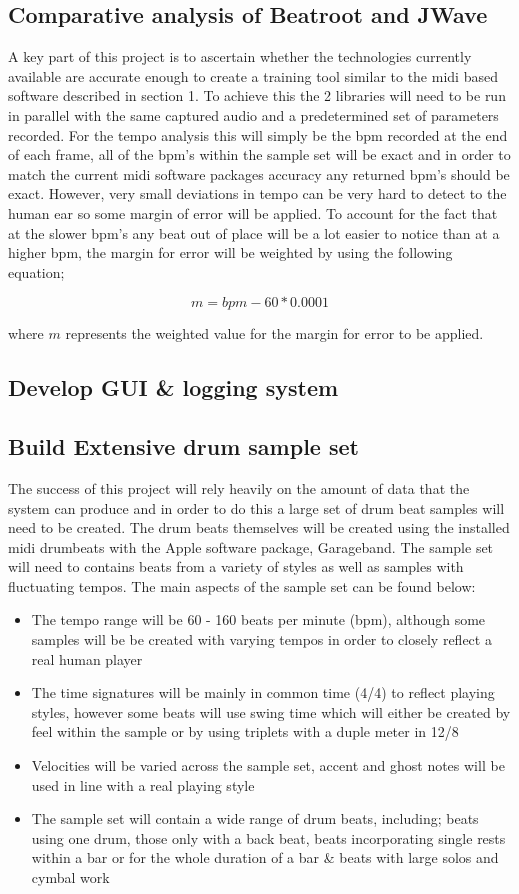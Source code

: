 \documentclass[a4paper, 11pt]{article}
\begin{document}
\subsection{Comparative analysis of Beatroot and JWave}
A key part of this project is to ascertain whether the technologies currently available are accurate enough to create a training tool similar to the midi based software described in section 1. To achieve this the 2 libraries will need to be run in parallel with the same captured audio and a predetermined set of parameters recorded. For the tempo analysis this will simply be the bpm recorded at the end of each frame, all of the bpm's within the sample set will be exact and in order to match the current midi software packages accuracy any returned bpm's should be exact. However, very small deviations in tempo can be very hard to detect to the human ear so some margin of error will be applied. To account for the fact that at the slower bpm's any beat out of place will be a lot easier to notice than at a higher bpm, the margin for error will be weighted by using the following equation;

\[ m = bpm - 60 * 0.0001\]

where \(m\) represents the weighted value for the margin for error to be applied.

\subsection{Develop GUI \& logging system}


\subsection{Build Extensive drum sample set}
The success of this project will rely heavily on the amount of data that the system can produce and in order to do this a large set of drum beat samples will need to be created. The drum beats themselves will be created using the installed midi drumbeats with the Apple software package, Garageband. The sample set will need to contains beats from a variety of styles as well as samples with fluctuating tempos. The main aspects of the sample set can be found below:

\begin{itemize}
\item The tempo range will be 60 - 160 beats per minute (bpm), although some samples will be be created with varying tempos in order to closely reflect a real human player
\item The time signatures will be mainly in common time (4/4) to reflect playing styles, however some beats will use swing time which will either be created by feel within the sample or by using triplets with a duple meter in 12/8
\item Velocities will be varied across the sample set, accent and ghost notes will be used in line with a real playing style
\item The sample set will contain a wide range of drum beats, including; beats using one drum, those only with a back beat, beats incorporating single rests within a bar or for the whole duration of a bar \& beats with large solos and cymbal work
\end{itemize} 
\end{document}
